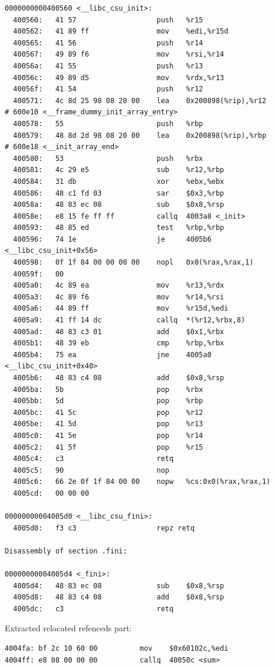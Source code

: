 \documentclass[11pt]{article}
\begin{document}
\begin{enumerate}
\begin{verbatim}
0000000000400560 <__libc_csu_init>:
  400560:	41 57                	push   %r15
  400562:	41 89 ff             	mov    %edi,%r15d
  400565:	41 56                	push   %r14
  400567:	49 89 f6             	mov    %rsi,%r14
  40056a:	41 55                	push   %r13
  40056c:	49 89 d5             	mov    %rdx,%r13
  40056f:	41 54                	push   %r12
  400571:	4c 8d 25 98 08 20 00 	lea    0x200898(%rip),%r12        # 600e10 <__frame_dummy_init_array_entry>
  400578:	55                   	push   %rbp
  400579:	48 8d 2d 98 08 20 00 	lea    0x200898(%rip),%rbp        # 600e18 <__init_array_end>
  400580:	53                   	push   %rbx
  400581:	4c 29 e5             	sub    %r12,%rbp
  400584:	31 db                	xor    %ebx,%ebx
  400586:	48 c1 fd 03          	sar    $0x3,%rbp
  40058a:	48 83 ec 08          	sub    $0x8,%rsp
  40058e:	e8 15 fe ff ff       	callq  4003a8 <_init>
  400593:	48 85 ed             	test   %rbp,%rbp
  400596:	74 1e                	je     4005b6 <__libc_csu_init+0x56>
  400598:	0f 1f 84 00 00 00 00 	nopl   0x0(%rax,%rax,1)
  40059f:	00 
  4005a0:	4c 89 ea             	mov    %r13,%rdx
  4005a3:	4c 89 f6             	mov    %r14,%rsi
  4005a6:	44 89 ff             	mov    %r15d,%edi
  4005a9:	41 ff 14 dc          	callq  *(%r12,%rbx,8)
  4005ad:	48 83 c3 01          	add    $0x1,%rbx
  4005b1:	48 39 eb             	cmp    %rbp,%rbx
  4005b4:	75 ea                	jne    4005a0 <__libc_csu_init+0x40>
  4005b6:	48 83 c4 08          	add    $0x8,%rsp
  4005ba:	5b                   	pop    %rbx
  4005bb:	5d                   	pop    %rbp
  4005bc:	41 5c                	pop    %r12
  4005be:	41 5d                	pop    %r13
  4005c0:	41 5e                	pop    %r14
  4005c2:	41 5f                	pop    %r15
  4005c4:	c3                   	retq   
  4005c5:	90                   	nop
  4005c6:	66 2e 0f 1f 84 00 00 	nopw   %cs:0x0(%rax,%rax,1)
  4005cd:	00 00 00 

00000000004005d0 <__libc_csu_fini>:
  4005d0:	f3 c3                	repz retq 

Disassembly of section .fini:

00000000004005d4 <_fini>:
  4005d4:	48 83 ec 08          	sub    $0x8,%rsp
  4005d8:	48 83 c4 08          	add    $0x8,%rsp
  4005dc:	c3                   	retq   

\end{verbatim}

Extracted relocated refenceds part:\\
\begin{verbatim}
4004fa:	bf 2c 10 60 00       	mov    $0x60102c,%edi
4004ff:	e8 08 00 00 00       	callq  40050c <sum>
\end{verbatim}
\end{enumerate}
\end{document}
